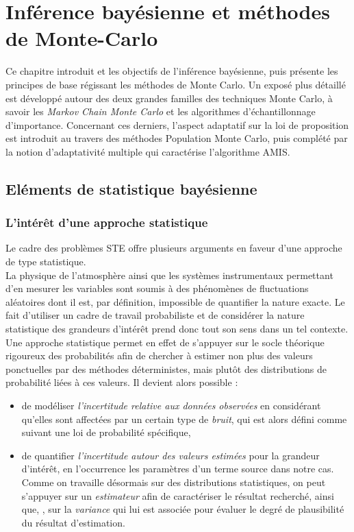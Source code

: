 \chapter{Inférence bayésienne et méthodes de Monte-Carlo}

Ce chapitre introduit  et les objectifs de l'inférence bayésienne, puis présente les principes de base régissant les méthodes de Monte Carlo. Un exposé plus détaillé est développé autour des deux grandes familles des techniques Monte Carlo, à savoir les \textit{Markov Chain Monte Carlo} et les algorithmes d'échantillonnage d'importance. Concernant ces derniers, l'aspect adaptatif sur la loi de proposition est introduit au travers des méthodes Population Monte Carlo, puis complété par la notion d'adaptativité multiple qui caractérise l'algorithme AMIS. 

	
	\section{Eléments de statistique bayésienne}
	
	\subsection{L'intérêt d'une approche statistique}
	\label{ss_erreurs}
	
	Le cadre des problèmes STE offre plusieurs arguments en faveur d'une approche de type statistique.\\
	
	La physique de l'atmosphère ainsi que les systèmes instrumentaux permettant d'en mesurer les variables sont soumis à des phénomènes de fluctuations aléatoires dont il est, par définition, impossible  de quantifier la nature exacte. Le fait d'utiliser un cadre de travail probabiliste et de considérer la nature statistique des grandeurs d'intérêt prend donc tout son sens dans un tel contexte. Une approche statistique permet en effet de s'appuyer sur le socle théorique rigoureux des probabilités afin de chercher à estimer non plus des valeurs ponctuelles par des méthodes déterministes, mais plutôt des distributions de probabilité liées à ces valeurs. Il devient alors possible : 
	\begin{itemize}
		\item de modéliser \textit{l'incertitude relative aux données observées} en considérant qu'elles sont affectées par un certain type de \textit{bruit}, qui est alors défini comme suivant une loi de probabilité spécifique,
		\item de quantifier \textit{l'incertitude autour des valeurs estimées} pour la grandeur d'intérêt, en l'occurrence les paramètres d'un terme source dans notre cas. Comme on travaille désormais sur des distributions statistiques, on peut s'appuyer sur un \textit{estimateur} afin de caractériser le résultat recherché, ainsi que, , sur la \textit{variance} qui lui est associée pour évaluer le degré de plausibilité du résultat d'estimation.
	\end{itemize}
	

